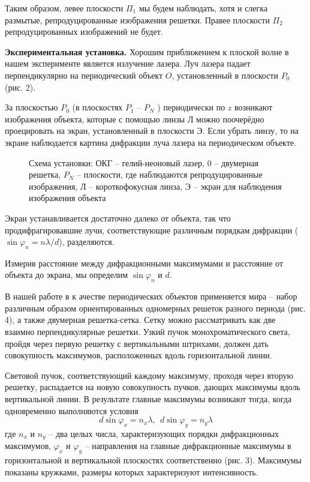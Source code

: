 \documentclass[14pt]{article}
\begin{document}
Таким образом, левее плоскости $\Pi_1$ мы будем наблюдать, хотя и слегка размытые, репродуцированные изображения решетки. Правее плоскости $\Pi_2$ репродуцированных изображений не будет.

\vspace{1cm}
\textbf{Экспериментальная установка.} Хорошим приближением к плоской волне в нашем эксперименте является излучение лазера. Луч лазера падает перпендикулярно на периодический объект $O$, установленный в плоскости $P_0$ (рис. 2). 

За плоскостью $P_0$ (в плоскостях $P_1$ -- $P_N$ ) периодически по $z$ возникают изображения объекта, которые с помощью линзы Л можно поочерёдно проецировать на экран,
установленный в плоскости Э. Если убрать линзу, то на экране наблюдается картина дифракции луча лазера на периодическом объекте.

\begin{figure}[h!]
	\caption{Схема установки: ОКГ -- гелий-неоновый лазер, 0 -- двумерная решетка, $P_N$ -- плоскости, где наблюдаются репродуцированные изображения, Л -- короткофокусная 	линза, Э -- экран для наблюдения изображения объекта}
	\label{fig:image}
\end{figure}

Экран устанавливается достаточно далеко от объекта, так что продифрагировавшие лучи, соответствующие различным порядкам дифракции ($\sin\varphi_n = n\lambda/d$), разделяются.


Измерив расстояние между дифракционными максимумами и расстояние от объекта до экрана, мы определим $\sin\varphi_n$ и $d$.


В нашей работе в к ачестве периодических объектов применяется мира -- набор различным образом ориентированных одномерных решеток разного периода (рис. 4), а также двумерная решетка-сетка. Сетку можно рассматривать как две взаимно перпендикулярные решетки. Узкий пучок монохроматического света, пройдя через первую решетку с вертикальными штрихами, должен дать совокупность максимумов, расположенных вдоль горизонтальной линии.

Световой пучок, соответствующий каждому максимуму, проходя через вторую решетку, распадается на новую совокупность пучков, дающих максимумы вдоль вертикальной линии.
В результате главные максимумы возникают тогда, когда одновременно выполняются условия
\begin{equation}
	d\sin\varphi_x = n_x\lambda,~~d\sin\varphi_y = n_y\lambda
\end{equation}
\noindent где $n_x$ и $n_y$ -- два целых числа, характеризующих порядки дифракционных максимумов, $\varphi_x$ и $\varphi_y$ -- направления на главные дифракционные
максимумы в горизонтальной и вертикальной плоскостях соответственно (рис. 3). Максимумы показаны кружками, размеры которых характеризуют интенсивность.
\end{document}
